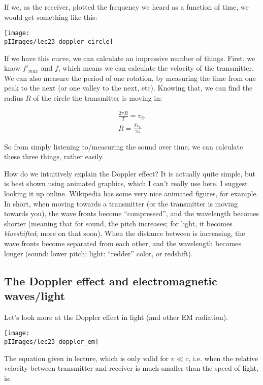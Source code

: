 If we, as the receiver, plotted the frequency we heard as a function of time, we would get something like this:

\begin{center}
\texttt{[image: \\pIImages/lec23\_doppler\_circle]}
\end{center}

If we have this curve, we can calculate an impressive number of things. First, we know ${f'}_{max}$ and $f$, which means we can calculate the velocity of the transmitter.\\
We can also measure the period of one rotation, by measuring the time from one peak to the next (or one valley to the next, etc). Knowing that, we can find the radius $R$ of the circle the transmitter is moving in:

\begin{align}
\frac{2 \pi R}{T} = v_{tr}\\
R = \frac{T v_{tr}}{2 \pi}
\end{align}

So from simply listening to/measuring the sound over time, we can calculate these three things, rather easily.

How do we intuitively explain the Doppler effect? It is actually quite simple, but is best shown using animated graphics, which I can't really use here. I suggest looking it up online. Wikipedia has some very nice animated figures, for example.\\
In short, when moving towards a transmitter (or the transmitter is moving towards you), the wave fronts become ``compressed'', and the wavelength becomes shorter (meaning that for sound, the pitch increases; for light, it becomes \emph{blueshifted}; more on that soon). When the distance between is increasing, the wave fronts become separated from each other, and the wavelength becomes longer (sound: lower pitch; light: ``redder'' color, or redshift).

\subsection{The Doppler effect and electromagnetic waves/light}

Let's look more at the Doppler effect in light (and other EM radiation).

\begin{center}
\texttt{[image: \\pIImages/lec23\_doppler\_em]}
\end{center}

The equation given in lecture, which is only valid for $v \ll c$, i.e. when the relative velocity between transmitter and receiver is much smaller than the speed of light, is:


